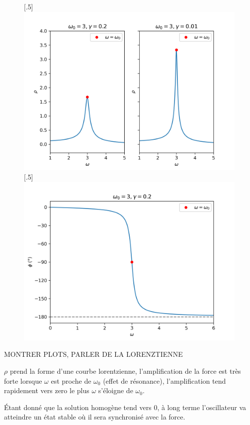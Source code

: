 \begin{figure}[!t]
    
    \subcaptionbox{}[.5\linewidth]{%
      \includegraphics[width=\linewidth]{images/harmonique/rho_plot_contrast.png}%
      \label{fig:free_vs_nano}
    }%
    \hfill
    \subcaptionbox{}[.5\linewidth]{%
      \includegraphics[width=\linewidth]{images/harmonique/frequency_phase_shift.png}%
      \label{fig:incubation_effect}
    }
  \end{figure}


MONTRER PLOTS, PARLER DE LA LORENZTIENNE

$\rho$ prend la forme d’une courbe lorentzienne, l’amplification 
de la force est très forte lorsque $\omega$ est proche de $\omega_0$ 
(effet de résonance), l’amplification tend rapidement vers zero 
le plus $\omega$ s’éloigne de $\omega_0$.

Étant donné que la solution homogène tend vers $0$, à long terme l'oscillateur va atteindre un état stable où il sera synchronisé avec la force.
